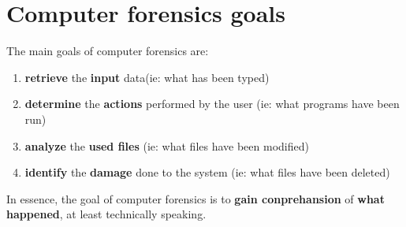 \section{Computer forensics goals}
The main goals of computer forensics are:
\begin{enumerate}
  \item \textbf{retrieve} the \textbf{input} data(ie: what has been typed)
  \item \textbf{determine} the \textbf{actions} performed by the user (ie: what programs
    have been run)
  \item \textbf{analyze} the \textbf{used files} (ie: what files have been
    modified)
  \item \textbf{identify} the \textbf{damage} done to the system (ie: what
    files have been deleted)
\end{enumerate}
\begin{boxH}
  In essence, the goal of computer forensics is to \textbf{gain conprehansion}
  of \textbf{what happened}, at least technically speaking.
\end{boxH}
